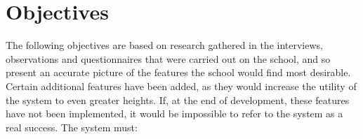
\section{Objectives}
The following objectives are based on research gathered in the interviews, observations and questionnaires that were carried out on the school, and so present an accurate picture of the features the school would find most desirable. Certain additional features have been added, as they would increase the utility of the system to even greater heights. If, at the end of development, these features have not been implemented, it would be impossible to refer to the system as a real success. The system must:\\

